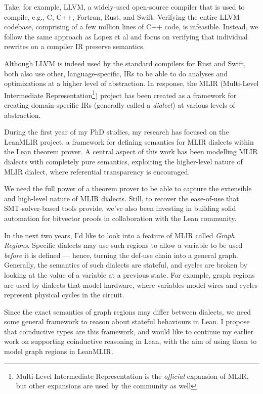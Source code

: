 \documentclass[a4paper]{scrartcl}
\begin{document}
Take, for example, LLVM, a widely-used open-source compiler that is used
to compile, e.g., C, C++, Fortran, Rust, and Swift. Verifying the entire
LLVM codebase, comprising of a few million lines of C++ code, is
infeasible. Instead, we follow the same approach as Lopez et al and
focus on verifying that individual rewrites on a compiler IR preserve
semantics.~\cite{lopesAlive2BoundedTranslation2021}

Although LLVM is indeed used by the standard compilers for Rust and
Swift, both also use other, language-specific, IRs to be able to do
analyses and optimizations at a higher level of abstraction. In
response, the MLIR (Multi-Level Intermediate Representation\footnote{Multi-Level
  Intermediate Representation is the \emph{official} expansion of MLIR,
  but other expansions are used by the community as well}) project has
been created as a framework for creating domain-specific IRs (generally
called a \emph{dialect}) at various levels of abstraction.

During the first year of my PhD studies, my research has focused on the
LeanMLIR project, a framework for defining semantics for MLIR dialects
within the Lean theorem prover. A central aspect of this work has been
modelling MLIR dialects with completely pure semantics, exploiting the
higher-level nature of MLIR dialect, where referential transparency is
encouraged.

We need the full power of a theorem prover to be able to capture the
extensible and high-level nature of MLIR dialects.
Still, to recover the ease-of-use that SMT-solver-based tools provide, 
we've also been investing in building solid automation for bitvector proofs in collaboration with the Lean community.

In the next two years, I'd like to look into a feature of MLIR called
\emph{Graph Regions}. Specific dialects may use such regions to allow a
variable to be used \emph{before} it is defined --- hence, turning the
def-use chain into a general graph. Generally, the semantics of such
dialects are stateful, and cycles are broken by looking at the value of
a variable at a previous state.
For example, graph regions are used by
dialects that model hardware,
where variables model wires and cycles represent physical cycles in the
circuit.~\cite{eldridgeMLIRHardwareCompiler}

Since the exact semantics of graph regions may differ between dialects,
we need some general framework to reason about stateful behaviours in
Lean. I propose that coinductive types are this framework, and would
like to continue my earlier work on supporting coinductive reasoning in
Lean, with the aim of using them to model graph regions in LeanMLIR.
\end{document}
